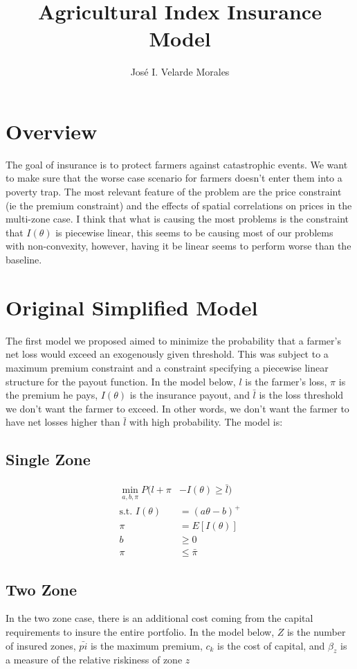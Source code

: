 \documentclass[11pt]{article}
\title{Agricultural Index Insurance Model}
\author{José I. Velarde Morales}
\begin{document}
\maketitle

\section{Overview}
The goal of insurance is to protect farmers against catastrophic events. We want to make sure that the worse case scenario for farmers doesn't enter them into a poverty trap. The most relevant feature of the problem are the price constraint (ie the premium constraint) and the effects of spatial correlations on prices in the multi-zone case. I think that what is causing the most problems is the constraint that $I(\theta)$ is piecewise linear, this seems to be causing most of our problems with non-convexity, however, having it be linear seems to perform worse than the baseline. 

\section{Original Simplified Model}

The first model we proposed aimed to minimize the probability that a farmer's net loss would exceed an exogenously given threshold. This was subject to a maximum premium constraint and a constraint specifying a piecewise linear structure for the payout function. In the model below, $l$ is the farmer's loss, $\pi$ is the premium he pays, $I(\theta)$ is the insurance payout, and $\bar{l}$ is the loss threshold we don't want the farmer to exceed. In other words, we don't want the farmer to have net losses higher than $\bar{l}$ with high probability. The model is:

\subsection*{Single Zone}

\begin{align}
    \min_{a,b,\pi} P(l + \pi &-I(\theta) \geq \bar{l})\\
    \text{s.t.   } I(\theta) &= (a\theta - b)^+\\
    \pi &= E[I(\theta)]\\
    b &\geq 0\\
    \pi &\leq \bar{\pi}
\end{align}

\subsection*{Two Zone}
In the two zone case, there is an additional cost coming from the capital requirements to insure the entire portfolio. In the model below, $Z$ is the number of insured zones, $\bar{pi}$ is the maximum premium, $c_k$ is the cost of capital, and $\beta_z$ is a measure of the relative riskiness of zone $z$
\end{document}
